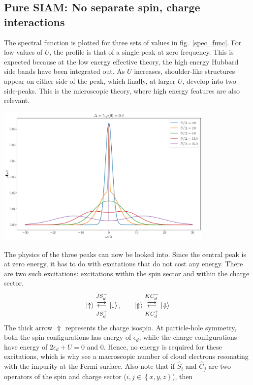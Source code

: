 \documentclass[twoside,11pt]{report}
\numberwithin{equation}{section}
\begin{document}
\subsection{Pure SIAM: No separate spin, charge interactions}
The spectral function is plotted for three sets of values in fig.~\ref{spec_func}.
For low values of \(U\), the profile is that of a single peak at zero frequency. This is expected because at the low energy effective theory, the high energy Hubbard side bands have been integrated out. As \(U\) increases, shoulder-like structures appear on either side of the peak, which finally, at larger \(U\), develop into two side-peaks. This is the microscopic theory, where high energy features are also relevant.
\begin{center}
	\includegraphics[width=0.8\textwidth]{../figures/siam_specfunc.pdf}
	\label{spec_func}
\end{center}
The physics of the three peaks can now be looked into. Since the central peak is at zero energy, it has to do with excitations that do not cost any energy. There are two such excitations: excitations within the spin sector and within the charge sector.
\begin{equation}\begin{aligned}
	\ket{\uparrow} \mathrel{\mathlarger{\mathlarger{\mathop{\rightleftarrows}}^{J S_d^-}_{JS_d^+}}}\ket{\downarrow}, &&&&\ket{\Uparrow} \mathrel{\mathlarger{\mathlarger{\mathop{\rightleftarrows}}^{K C_d^-}_{K C_d^+}}}\ket{\Downarrow}\\
\end{aligned}\end{equation}
The thick arrow \(\Uparrow\) represents the charge isospin. At particle-hole symmetry, both the spin configurations has energy of \(\epsilon_d\), while the charge configurations have energy of \(2\epsilon_d + U=0\) and 0. Hence, no energy is required for these excitations, which is why see a macroscopic number of cloud electrons resonating with the impurity at the Fermi surface. Also note that if \(\hat S_i\) and \(\hat C_j\) are two operators of the spin and charge sector (\(i,j \in \left\{ x,y,z \right\} \)), then
\end{document}
